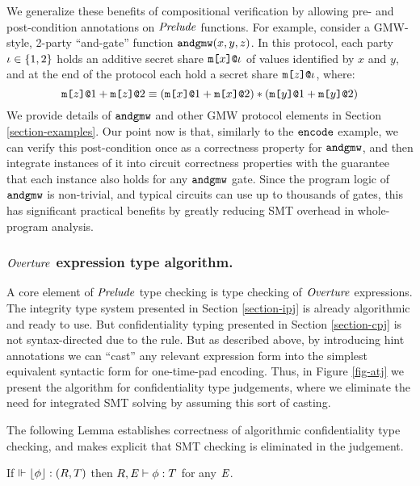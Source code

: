 We generalize these benefits of compositional verification by allowing
pre- and post-condition annotations on $\mathit{Prelude}$ functions. For
example, consider a GMW-style, 2-party ``and-gate'' function
$\texttt{andgmw}(x,y,z)$. In this protocol, each party $\iota
\in \{1,2\}$ holds an additive secret share $\texttt{m[}x\texttt{]}\texttt{@}\iota$ of
values identified by $x$ and $y$, and at the end of the
protocol each hold a secret share $\texttt{m[}z\texttt{]}\texttt{@}\iota$, where:
$$
\texttt{m[}z\texttt{]}\texttt{@}1 + \texttt{m[}z\texttt{]}\texttt{@}2 \equiv (\texttt{m[}x\texttt{]}\texttt{@}1 + \texttt{m[}x\texttt{]}\texttt{@}2) * (\texttt{m[}y\texttt{]}\texttt{@}1 + \texttt{m[}y\texttt{]}\texttt{@}2)
$$
We provide details of $\texttt{andgmw}$ and other GMW protocol
elements in Section \ref{section-examples}.  Our point now is that,
similarly to the $\texttt{encode}$ example, we can verify this
post-condition once as a correctness property for $\texttt{andgmw}$, and
then integrate instances of it into circuit correctness properties
with the guarantee that each instance also holds for any
$\texttt{andgmw}$ gate.  Since the program logic of $\texttt{andgmw}$ is
non-trivial, and typical circuits can use up to thousands of gates,
this has significant practical benefits by greatly reducing SMT overhead
in whole-program analysis.

\subsubsection{$\mathit{Overture}$ expression type algorithm.}

A core element of $\mathit{Prelude}$ type checking is type checking
of $\mathit{Overture}$ expressions. The integrity type system presented in Section
\ref{section-ipj} is already algorithmic and ready to use. But confidentiality
typing presented in Section \ref{section-cpj} is not syntax-directed
due to the  rule. But as described above, by introducing
hint annotations we can ``cast'' any relevant expression form into
the simplest equivalent syntactic form for one-time-pad encoding.
Thus, in Figure \ref{fig-atj} we present the algorithm for
confidentiality type judgements, where we eliminate the need for
integrated SMT solving by assuming this sort of casting. 

\atjfig

The following Lemma establishes correctness of algorithmic confidentiality
type checking, and makes explicit that SMT checking is eliminated in the
judgement.
\begin{lemma}
  \label{lemma-atj-sound}
  If $\Vdash \lfloor \phi \rfloor : (R,T)$ then $R,\mathit{E} \vdash \phi : T$ for any $\mathit{E}$.
\end{lemma}


